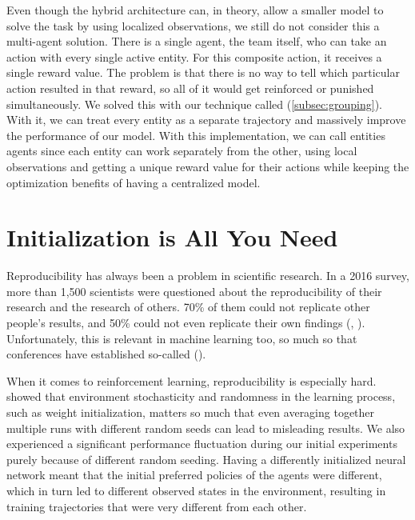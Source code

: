 \noindent Even though the hybrid architecture can, in theory, allow a smaller model to solve the task by using localized observations, we still do not consider this a multi-agent solution. There is a single agent, the team itself, who can take an action with every single active entity. For this composite action, it receives a single reward value. The problem is that there is no way to tell which particular action resulted in that reward, so all of it would get reinforced or punished simultaneously. We solved this with our technique called  (\autoref{subsec:grouping}). With it, we can treat every entity as a separate trajectory and massively improve the performance of our model. With this implementation, we can call entities agents since each entity can work separately from the other, using local observations and getting a unique reward value for their actions while keeping the optimization benefits of having a centralized model.


\section{Initialization is All You Need}
\label{ch:disc-init-is-all-you-need}

\noindent Reproducibility has always been a problem in scientific research. In a 2016 survey, more than 1,500 scientists were questioned about the reproducibility of their research and the research of others. 70\% of them could not replicate other people's results, and 50\% could not even replicate their own findings (\cite{karbasi2023replicability}, \cite{Baker2016}). Unfortunately, this  is relevant in machine learning too, so much so that conferences have established so-called  (\cite{pwc_rc_2022}).

\bigskip

\noindent When it comes to reinforcement learning, reproducibility is especially hard. \cite{henderson2019deep} showed that environment stochasticity and randomness in the learning process, such as weight initialization, matters so much that even averaging together multiple runs with different random seeds can lead to misleading results. We also experienced a significant performance fluctuation during our initial experiments purely because of different random seeding. Having a differently initialized neural network meant that the initial preferred policies of the agents were different, which in turn led to different observed states in the environment, resulting in training trajectories that were very different from each other.

